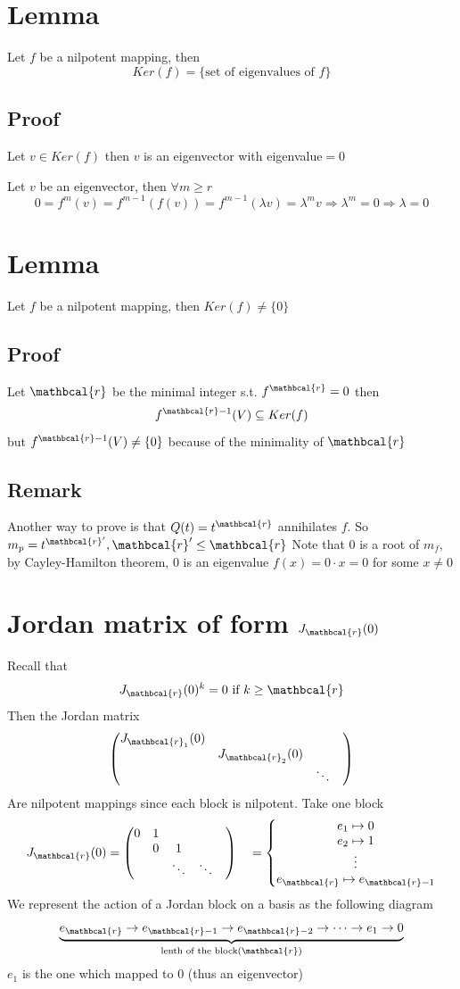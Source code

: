 \documentclass{book}
\begin{document}
\section{Lemma}
Let $f$ be a nilpotent mapping, then $$Ker(f)=\{\text{set of eigenvalues of }f\}$$
\subsection*{Proof}
Let $v\in Ker(f)$ then $v$ is an eigenvector with eigenvalue$=0$

Let $v$ be an eigenvector, then $\forall m\geq r$
$$0=f^m(v)=f^{m-1}(f(v))=f^{m-1}(\lambda v)=\lambda^m v\Rightarrow \lambda^m=0\Rightarrow \lambda=0$$
\section{Lemma}
Let $f$ be a nilpotent mapping, then $Ker (f)\neq\{0\}$
\subsection*{Proof}
Let $\mathbcal{r}$ be the minimal integer s.t. $f^\mathbcal{r}=0$ then
$$f^{\mathbcal{r}-1}(V)\subseteq Ker(f)$$
but $f^{\mathbcal{r}-1}(V)\neq\{0\}$ because of the minimality of $\mathbcal{r}$
\subsection*{Remark}
Another way to prove is that $Q(t)=t^\mathbcal{r}$ annihilates $f$. So $m_p=t^{\mathbcal{r}'},\mathbcal{r}'\leq\mathbcal{r}$ Note that 0 is a root of $m_f$, by Cayley-Hamilton theorem, 0 is an eigenvalue $f(x)=0\cdot x=0$ for some $x\neq0$
\section{Jordan matrix of form $J_\mathbcal{r}(0)$}
Recall that $$J_\mathbcal{r}(0)^k=0\text{ if }k\geq \mathbcal{r}$$
Then the Jordan matrix $$\begin{pmatrix}
    J_{\mathbcal{r}_1}(0)&&\\
    &J_{\mathbcal{r}_2}(0)&&\\
    &&\ddots
\end{pmatrix}$$
Are nilpotent mappings since each block is nilpotent. Take one block
$$J_\mathbcal{r}(0)=\begin{pmatrix}
    0&1&&\\
    &0&1&&\\
    &&\ddots&\ddots
\end{pmatrix}\quad=\left\{\begin{matrix}
    e_1\mapsto 0\\e_2\mapsto 1\\\vdots\\e_\mathbcal{r}\mapsto e_{\mathbcal{r}-1}
\end{matrix}\right.$$
We represent the action of a Jordan block on a basis as the following diagram
$$\underbrace{e_\mathbcal{r}\rightarrow e_{\mathbcal{r}-1}\rightarrow e_{\mathbcal{r}-2}\rightarrow \cdots \rightarrow e_1\rightarrow 0}\limits_{\text{lenth of the block}(\mathbcal{r})}$$$e_1$ is the one which mapped to 0 (thus an eigenvector)
\end{document}
